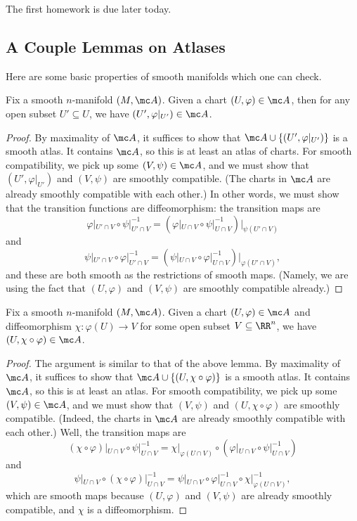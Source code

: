 \documentclass[../notes.tex]{subfiles}
\begin{document}
The first homework is due later today.

\subsection{A Couple Lemmas on Atlases}
Here are some basic properties of smooth manifolds which one can check.
\begin{lemma}
	Fix a smooth $n$-manifold $(M,\mc A)$. Given a chart $(U,\varphi)\in\mc A$, then for any open subset $U'\subseteq U$, we have $(U',\varphi|_{U'})\in\mc A$.
\end{lemma}
\begin{proof}
	By maximality of $\mc A$, it suffices to show that $\mc A\cup\{(U',\varphi|_{U'})\}$ is a smooth atlas. It contains $\mc A$, so this is at least an atlas of charts. For smooth compatibility, we pick up some $(V,\psi)\in\mc A$, and we must show that $(U',\varphi|_{U'})$ and $(V,\psi)$ are smoothly compatible. (The charts in $\mc A$ are already smoothly compatible with each other.) In other words, we must show that the transition functions are diffeomorphism: the transition maps are
	\[\varphi|_{U'\cap V}\circ\psi|_{U'\cap V}^{-1}=\left(\varphi|_{U\cap V}\circ\psi|_{U\cap V}^{-1}\right)|_{\psi(U'\cap V)}\]
	and
	\[\psi|_{U'\cap V}\circ\varphi|_{U'\cap V}^{-1}=\left(\psi|_{U\cap V}\circ\varphi|_{U\cap V}^{-1}\right)|_{\varphi(U'\cap V)},\]
	and these are both smooth as the restrictions of smooth maps. (Namely, we are using the fact that $(U,\varphi)$ and $(V,\psi)$ are smoothly compatible already.)
\end{proof}
\begin{lemma}
	Fix a smooth $n$-manifold $(M,\mc A)$. Given a chart $(U,\varphi)\in\mc A$ and diffeomorphism $\chi\colon\varphi(U)\to V$ for some open subset $V\subseteq\RR^n$, we have $(U,\chi\circ\varphi)\in\mc A$.
\end{lemma}
\begin{proof}
	The argument is similar to that of the above lemma. By maximality of $\mc A$, it suffices to show that $\mc A\cup\{(U,\chi\circ\varphi)\}$ is a smooth atlas. It contains $\mc A$, so this is at least an atlas. For smooth compatibility, we pick up some $(V,\psi)\in\mc A$, and we must show that $(V,\psi)$ and $(U,\chi\circ\varphi)$ are smoothly compatible. (Indeed, the charts in $\mc A$ are already smoothly compatible with each other.) Well, the transition maps are
	\[(\chi\circ\varphi)|_{U\cap V}\circ\psi|_{U\cap V}^{-1}=\chi|_{\varphi(U\cap V)}\circ\left(\varphi|_{U\cap V}\circ\psi|_{U\cap V}^{-1}\right)\]
	and
	\[\psi|_{U\cap V}\circ(\chi\circ\varphi)|_{U\cap V}^{-1}=\psi|_{U\cap V}\circ\varphi|_{U\cap V}^{-1}\circ\chi|_{\varphi(U\cap V)}^{-1},\]
	which are smooth maps because $(U,\varphi)$ and $(V,\psi)$ are already smoothly compatible, and $\chi$ is a diffeomorphism.
\end{proof}
\end{document}
